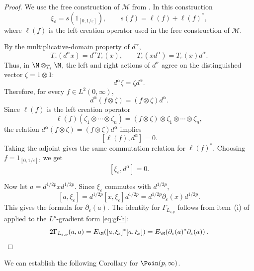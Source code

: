 \documentclass[sn-mathphys-num]{sn-jnl}
\begin{document}
\begin{proof}
We use the free construction of $\mathscr M$ from
\cite[Section~2]{JungeRicardShlyakhtenko2025}. In this construction
\[
  \xi_\varepsilon=s(1_{[0,1/\varepsilon]}),
  \qquad s(f)=\ell(f)+\ell(f)^*,
\]
where $\ell(f)$ is the left creation operator used in the free
construction of $\mathscr M$.

By the multiplicative-domain property of $d^\alpha$,
\[
  T_\varepsilon(d^\alpha x)=d^\alpha T_\varepsilon(x),
  \qquad
  T_\varepsilon(xd^\alpha)=T_\varepsilon(x)d^\alpha .
\]
Thus, in $\M\otimes_{T_\varepsilon}\M$, the left and right actions of
$d^\alpha$ agree on the distinguished vector $\zeta=1\otimes1$:
\[
  d^\alpha\zeta=\zeta d^\alpha .
\]
Therefore, for every $f\in L^2(0,\infty)$,
\[
  d^\alpha(f\otimes\zeta)=(f\otimes\zeta)d^\alpha .
\]
Since $\ell(f)$ is the left creation operator
\[
\ell(f)(\zeta_1\otimes\cdots\otimes\zeta_n)
=
(f\otimes\zeta)\otimes \zeta_1\otimes\cdots\otimes\zeta_n,
\]
the relation $d^\alpha(f\otimes\zeta)=(f\otimes\zeta)d^\alpha$ implies
\[
  [\ell(f),d^\alpha]=0.
\]
Taking the adjoint gives the same commutation relation for $\ell(f)^*$.
Choosing $f=1_{[0,1/\varepsilon]}$, we get
\[
  [\xi_\varepsilon,d^\alpha]=0.
\]

Now let $a=d^{1/2p}xd^{1/2p}$. Since $\xi_\varepsilon$ commutes with
$d^{1/2p}$,
\[
  [a,\xi_\varepsilon]
  =
  d^{1/2p}[x,\xi_\varepsilon]d^{1/2p}
  =
  d^{1/2p}\partial_\varepsilon(x)d^{1/2p}.
\]
This gives the formula for $\partial_{\varepsilon}(a)$. The identity
for $\Gamma_{L_{\varepsilon,p}}$ follows from item~(i) of
 applied to the $L^p$-gradient form
\cref{eq:gf-h}:
\[
  2\Gamma_{L_{\varepsilon,p}}(a,a)
  =
  E_{\M}\!\left(
    [a,\xi_\varepsilon]^*[a,\xi_\varepsilon]
  \right)
  =
  E_{\M}\!\left(
    \partial_{\varepsilon}(a)^*
    \partial_{\varepsilon}(a)
  \right).
\]
\end{proof}
We can establish the following Corollary for $\Poin(p,\infty)$.
\end{document}
